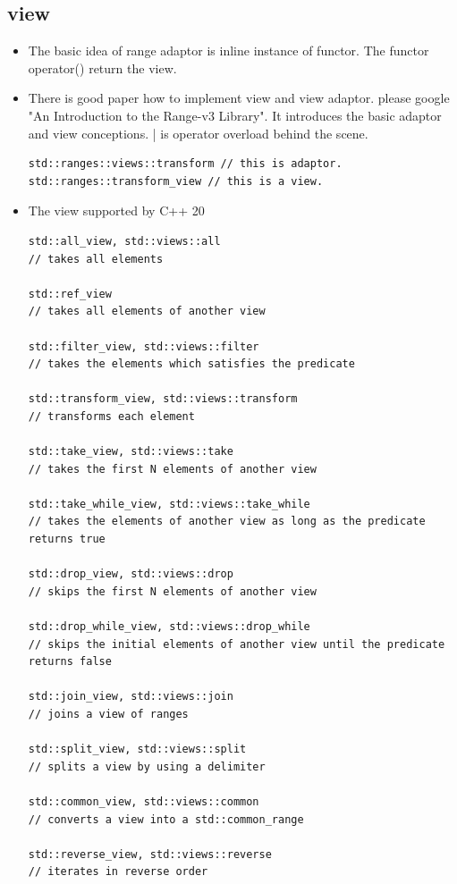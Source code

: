 \documentclass[a4paper,11pt,twoside]{book}
\begin{document}
\subsection{view}
\begin{itemize}
\item The basic idea of range adaptor is inline instance of functor. The functor operator() return the view. 

\item There is good paper how to implement view and view adaptor. please google "An Introduction to the Range-v3 Library". It introduces the basic adaptor and view conceptions. | is operator overload behind the scene. 

\begin{lstlisting}
std::ranges::views::transform // this is adaptor.
std::ranges::transform_view // this is a view.
\end{lstlisting}

\item The view supported by C++ 20
\begin{lstlisting}
std::all_view, std::views::all               
// takes all elements

std::ref_view                                
// takes all elements of another view

std::filter_view, std::views::filter         
// takes the elements which satisfies the predicate

std::transform_view, std::views::transform   
// transforms each element

std::take_view, std::views::take             
// takes the first N elements of another view

std::take_while_view, std::views::take_while 
// takes the elements of another view as long as the predicate returns true

std::drop_view, std::views::drop             
// skips the first N elements of another view

std::drop_while_view, std::views::drop_while 
// skips the initial elements of another view until the predicate returns false

std::join_view, std::views::join             
// joins a view of ranges

std::split_view, std::views::split           
// splits a view by using a delimiter

std::common_view, std::views::common         
// converts a view into a std::common_range

std::reverse_view, std::views::reverse       
// iterates in reverse order


\end{lstlisting}
\end{itemize}
\end{document}
